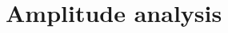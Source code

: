 \documentclass[aspectratio=169]{beamer}
\begin{document}

\section{Amplitude analysis}
\end{document}
